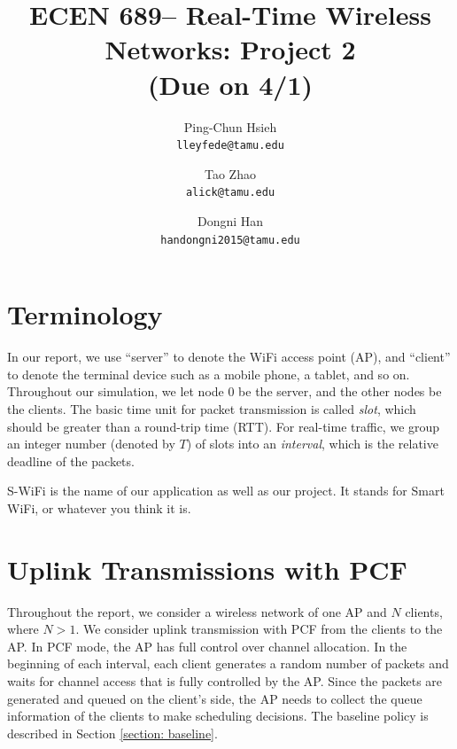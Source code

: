 \documentclass{article}
\begin{document}
\title{\bf ECEN 689-- Real-Time Wireless Networks: Project 2\\ (Due on 4/1)}
\date{}
\author{%
Ping-Chun Hsieh\\
\texttt{lleyfede@tamu.edu}
\and
Tao Zhao\\
\texttt{alick@tamu.edu}
\and
Dongni Han\\
\texttt{handongni2015@tamu.edu}
}
\maketitle

\section*{Terminology}

In our report, we use ``server'' to denote the WiFi access point (AP), and
``client'' to denote the terminal device such as a mobile phone, a tablet, and
so on. Throughout our simulation, we let node $0$ be the server, and the other nodes be the clients. The basic time unit for packet transmission is called \emph{slot}, which should be greater than a round-trip time (RTT). For real-time traffic, we group an integer number (denoted by $T$) of slots into an \emph{interval}, which is the relative deadline of the packets. 

S-WiFi is the name of our application as well as our project. It stands for
Smart WiFi, or whatever you think it is.


\section*{Uplink Transmissions with PCF}
\label{section: uplink}
Throughout the report, we consider a wireless network of one AP and $N$ clients, where $N>1$. We consider uplink transmission with PCF from the clients to the AP. In PCF mode, the AP has full control over channel allocation. In the beginning of each interval, each client generates a random number of packets and waits for channel access that is fully controlled by the AP. Since the packets are generated and queued on the client's side, the AP needs to collect the queue information of the clients to make scheduling decisions. The baseline policy is described in Section \ref{section: baseline}.
\end{document}
